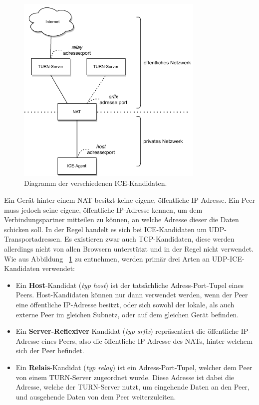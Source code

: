 \begin{figure}[h]
\centering
\includegraphics[width=0.80\textwidth]{bilder/PDF_SVG/CANDIDATES_OLD.pdf}
\caption{Diagramm der verschiedenen \acs{ICE}-Kandidaten.}
\label{fig:icecandidates}
\end{figure}

Ein Gerät hinter einem \acs{NAT} besitzt keine eigene, öffentliche \acs{IP}-Adresse. Ein Peer muss jedoch seine eigene, öffentliche \acs{IP}-Adresse kennen, um dem Verbindungspartner mitteilen zu können, an welche Adresse dieser die Daten schicken soll. In der Regel handelt es sich bei \acs{ICE}-Kandidaten um \acs{UDP}-Transportadressen. Es existieren zwar auch \acs{TCP}-Kandidaten, diese werden allerdings nicht von allen Browsern unterstützt und in der Regel nicht verwendet. Wie aus Abbildung ~\ref{fig:icecandidates} zu entnehmen, werden primär drei Arten an \acs{UDP}-\acs{ICE}-Kandidaten verwendet:

\begin{itemize}
	\item Ein \textbf{Host}-Kandidat (\textit{typ host}) ist der tatsächliche Adress-Port-Tupel eines Peers. Host-Kandidaten können nur dann verwendet werden, wenn der Peer eine öffentliche \acs{IP}-Adresse besitzt, oder sich sowohl der lokale, als auch externe Peer im gleichen Subnetz, oder auf dem gleichen Gerät befinden.
	\item Ein \textbf{Server-Reflexiver}-Kandidat (\textit{typ srflx}) repräsentiert die öffentliche \acs{IP}-Adresse eines Peers, also die öffentliche \acs{IP}-Adresse des \acs{NAT}s, hinter welchem sich der Peer befindet.
	\item Ein \textbf{Relais}-Kandidat (\textit{typ relay}) ist ein Adress-Port-Tupel, welcher dem Peer von einem \acs{TURN}-Server zugeordnet wurde. Diese Adresse ist dabei die Adresse, welche der \acs{TURN}-Server nutzt, um eingehende Daten an den Peer, und ausgehende Daten von dem Peer weiterzuleiten.
\end{itemize}

